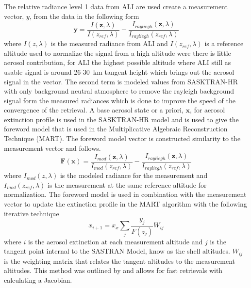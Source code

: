 \documentclass[12pt]{article}
\begin{document}
The relative radiance level 1 data from ALI are used create a measurement vector, $y$, from the data in the following form
\begin{equation}
    \mathbf{y} = \frac{I(\mathbf{z},\lambda)}{I(z_{ref},\lambda)}-\frac{I_{rayliegh}(\mathbf{z},\lambda)}{I_{rayliegh}(z_{ref},\lambda)}
    \label{eqn:measurementVector}
\end{equation}
where $I(z,\lambda)$ is the measured radiance from ALI and $I(z_{ref},\lambda)$ is a reference altitude used to normalize the signal from a high altitude were there is little aerosol contribution, for ALI the highest possible altitude where ALI still as usable signal is around 26-30~km tangent height which brings out the aerosol signal in the vector. The second term is modeled values from SASKTRAN-HR with only background neutral atmosphere to remove the rayleigh background signal form the measured radiances which is done to improve the speed of the convergence of the retrieval. A base aerosol state or a priori, $\mathbf{x}$, for aerosol extinction profile is used in the SASKTRAN-HR model and is used to give the foreword model that is used in the Multiplicative Algebraic Reconstruction Technique (MART). The foreword model vector is constructed similarity to the measurement vector and follows.
\begin{equation}
    \mathbf{F}(\mathbf{x}) = \frac{I_{mod}(\mathbf{z},\lambda)}{I_{mod}(z_{ref},\lambda)}-\frac{I_{rayliegh}(\mathbf{z},\lambda)}{I_{rayliegh}(z_{ref},\lambda)}
    \label{eqn:forewordModel}
\end{equation}
where $I_{mod}(z,\lambda)$ is the modeled radiance for the measurement and $I_{mod}(z_{ref},\lambda)$ is the measurement at the same reference altitude for normalization. The foreword model is used in combination with the measurement vector to update the extinction profile in the MART algorithm with the following iterative technique
\begin{equation}
    x_{i+1} = x_{x}\sum_{j}\frac{y_{j}}{F(z_{j})}W_{ij}
\end{equation}
where $i$ is the aerosol extinction at each measurement altitude and $j$ is the tangent point internal to the SASTRAN Model, know as the shell altitudes. $W_{ij}$ is the weighting matrix that relates the tangent altitudes to the measurement altitudes. This method was outlined by \cite{Degenstein2009} and allows for fast retrievals with calculating a Jacobian.
\end{document}
